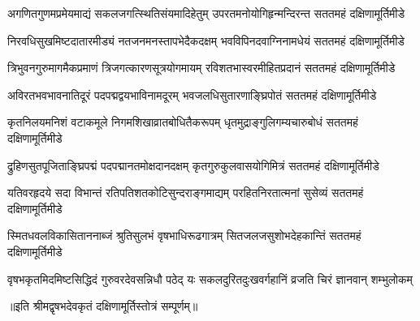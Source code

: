 
\fourlineindentedshloka
{अगणितगुणमप्रमेयमाद्यं}
{सकलजगत्स्थितिसंयमादिहेतुम्}
{उपरतमनोयोगिहृन्मन्दिरन्त}
{सततमहं दक्षिणामूर्तिमीडे}

\fourlineindentedshloka
{निरवधिसुखमिष्टदातारमीड्यं}
{नतजनमनस्तापभेदैकदक्षम्}
{भवविपिनदवाग्निनामधेयं}
{सततमहं दक्षिणामूर्तिमीडे}

\fourlineindentedshloka
{त्रिभुवनगुरुमागमैकप्रमाणं}
{त्रिजगत्कारणसूत्रयोगमायम्}
{रविशतभास्वरमीहितप्रदानं}
{सततमहं दक्षिणामूर्तिमीडे}

\fourlineindentedshloka
{अविरतभवभावनातिदूरं}
{पदपद्मद्वयभाविनामदूरम्}
{भवजलधिसुतारणाङ्घ्रिपोतं}
{सततमहं दक्षिणामूर्तिमीडे}

\fourlineindentedshloka
{कृतनिलयमनिशं वटाकमूले}
{निगमशिखाव्रातबोधितैकरूपम्}
{धृतमुद्राङ्गुलिगम्यचारुबोधं}
{सततमहं दक्षिणामूर्तिमीडे}

\fourlineindentedshloka
{द्रुहिणसुतपूजिताङ्घ्रिपद्मं}
{पदपद्मानतमोक्षदानदक्षम्}
{कृतगुरुकुलवासयोगिमित्रं}
{सततमहं दक्षिणामूर्तिमीडे}

\fourlineindentedshloka
{यतिवरहृदये सदा विभान्तं}
{रतिपतिशतकोटिसुन्दराङ्गमाद्यम्}
{परहितनिरतात्मनां सुसेव्यं}
{सततमहं दक्षिणामूर्तिमीडे}

\fourlineindentedshloka
{स्मितधवलविकासिताननाब्जं}
{श्रुतिसुलभं वृषभाधिरूढगात्रम्}
{सितजलजसुशोभदेहकान्तिं}
{सततमहं दक्षिणामूर्तिमीडे}

\fourlineindentedshloka
{वृषभकृतमिदमिष्टसिद्धिदं}
{गुरुवरदेवसन्निधौ पठेद् यः}
{सकलदुरितदुःखवर्गहानिं}
{व्रजति चिरं ज्ञानवान् शम्भुलोकम्}

॥इति श्रीमद्वृषभदेवकृतं दक्षिणामूर्तिस्तोत्रं सम्पूर्णम्॥